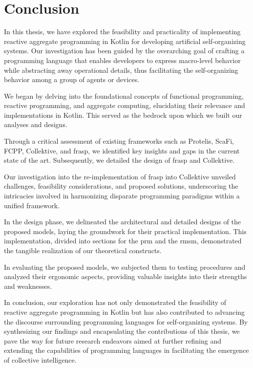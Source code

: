 
\chapter{Conclusion}
\label{chap:conclusion}

In this thesis, we have explored the feasibility and practicality of implementing reactive aggregate programming in Kotlin for developing artificial self-organizing systems. Our investigation has been guided by the overarching goal of crafting a programming language that enables developers to express macro-level behavior while abstracting away operational details, thus facilitating the self-organizing behavior among a group of agents or devices.

We began by delving into the foundational concepts of functional programming, reactive programming, and aggregate computing, elucidating their relevance and implementations in Kotlin. This served as the bedrock upon which we built our analyses and designs.

Through a critical assessment of existing frameworks such as Protelis, ScaFi, FCPP, Collektive, and \ac{frasp}, we identified key insights and gaps in the current state of the art. Subsequently, we detailed the design of \ac{frasp} and Collektive.

Our investigation into the re-implementation of \ac{frasp} into Collektive unveiled challenges, feasibility considerations, and proposed solutions, underscoring the intricacies involved in harmonizing disparate programming paradigms within a unified framework.

In the design phase, we delineated the architectural and detailed designs of the proposed models, laying the groundwork for their practical implementation. This implementation, divided into sections for the \ac{prm} and the \ac{rmsm}, demonstrated the tangible realization of our theoretical constructs.

In evaluating the proposed models, we subjected them to testing procedures and analyzed their ergonomic aspects, providing valuable insights into their strengths and weaknesses.

In conclusion, our exploration has not only demonstrated the feasibility of reactive aggregate programming in Kotlin but has also contributed to advancing the discourse surrounding programming languages for self-organizing systems. By synthesizing our findings and encapsulating the contributions of this thesis, we pave the way for future research endeavors aimed at further refining and extending the capabilities of programming languages in facilitating the emergence of collective intelligence.

